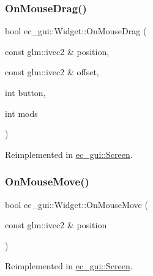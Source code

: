 \mbox{\label{classec__gui_1_1_widget_a1801c494e708ae6deb39386feb352f23}} 
\subsubsection{\texorpdfstring{On\+Mouse\+Drag()}{OnMouseDrag()}}
{\footnotesize\ttfamily bool ec\+\_\+gui\+::\+Widget\+::\+On\+Mouse\+Drag (\begin{DoxyParamCaption}\item[{const glm\+::ivec2 \&}]{position,  }\item[{const glm\+::ivec2 \&}]{offset,  }\item[{int}]{button,  }\item[{int}]{mods }\end{DoxyParamCaption})\hspace{0.3cm}{\ttfamily [virtual]}}



Reimplemented in \mbox{\hyperlink{classec__gui_1_1_screen_a79cafedae2faa7090fec46e7ad16efd9}{ec\+\_\+gui\+::\+Screen}}.

\mbox{\label{classec__gui_1_1_widget_a8b4943212deb1a9774d119b0b09f9078}} 
\subsubsection{\texorpdfstring{On\+Mouse\+Move()}{OnMouseMove()}}
{\footnotesize\ttfamily bool ec\+\_\+gui\+::\+Widget\+::\+On\+Mouse\+Move (\begin{DoxyParamCaption}\item[{const glm\+::ivec2 \&}]{position }\end{DoxyParamCaption})\hspace{0.3cm}{\ttfamily [virtual]}}



Reimplemented in \mbox{\hyperlink{classec__gui_1_1_screen_a22ba089bf993e921d2d9b8e26f620e52}{ec\+\_\+gui\+::\+Screen}}.

\mbox{\label{classec__gui_1_1_widget_a528c2b3639db65de6281fc1bb679dfcb}} 
